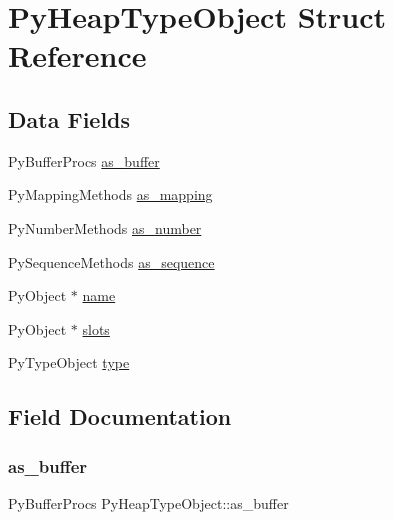 \hypertarget{struct_py_heap_type_object}{}\section{Py\+Heap\+Type\+Object Struct Reference}
\label{struct_py_heap_type_object}
\subsection*{Data Fields}
\begin{DoxyCompactItemize}
\item 
Py\+Buffer\+Procs \hyperlink{struct_py_heap_type_object_a026c64b0a5163ea580e79640ecf209de}{as\+\_\+buffer}
\item 
Py\+Mapping\+Methods \hyperlink{struct_py_heap_type_object_a3112d193aea288a92036360bec1ce0a5}{as\+\_\+mapping}
\item 
Py\+Number\+Methods \hyperlink{struct_py_heap_type_object_a795de378df40d11321c0dbe463759560}{as\+\_\+number}
\item 
Py\+Sequence\+Methods \hyperlink{struct_py_heap_type_object_ad553caad5da3a7004aae1b7ac0289f12}{as\+\_\+sequence}
\item 
Py\+Object $\ast$ \hyperlink{struct_py_heap_type_object_a5440c0413b3c519d996119695c957c80}{name}
\item 
Py\+Object $\ast$ \hyperlink{struct_py_heap_type_object_a15212a8f85d939b3f4b133ecda1b62e5}{slots}
\item 
Py\+Type\+Object \hyperlink{struct_py_heap_type_object_a8b961137de4ebeed5a5d2e4b47ee1ca7}{type}
\end{DoxyCompactItemize}


\subsection{Field Documentation}
\mbox{\label{struct_py_heap_type_object_a026c64b0a5163ea580e79640ecf209de}} 
\subsubsection{\texorpdfstring{as\+\_\+buffer}{as\_buffer}}
{\footnotesize\ttfamily Py\+Buffer\+Procs Py\+Heap\+Type\+Object\+::as\+\_\+buffer}

